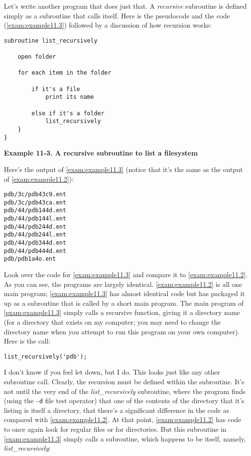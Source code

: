 Let's write another program that does just that. A \textit{recursive} subroutine is defined simply as a subroutine that calls itself. Here is the pseudocode and the code (\autoref{exam:example11.3}) followed by a discussion of how recursion works: 

\begin{lstlisting}
subroutine list_recursively

    open folder

    for each item in the folder

        if it's a file
            print its name

        else if it's a folder
            list_recursively
    }
}
\end{lstlisting}

\textbf{Example 11-3. A recursive subroutine to list a filesystem}


Here's the output of \autoref{exam:example11.3} (notice that it's the same as the output of \autoref{exam:example11.2}): 

\begin{lstlisting}
pdb/3c/pdb43c9.ent
pdb/3c/pdb43ca.ent
pdb/44/pdb144d.ent
pdb/44/pdb144l.ent
pdb/44/pdb244d.ent
pdb/44/pdb244l.ent
pdb/44/pdb344d.ent
pdb/44/pdb444d.ent
pdb/pdb1a4o.ent
\end{lstlisting}

Look over the code for \autoref{exam:example11.3} and compare it to \autoref{exam:example11.2}. As you can see, the programs are largely identical. \autoref{exam:example11.2} is all one main program; \autoref{exam:example11.3} has almost identical code but has packaged it up as a subroutine that is called by a short main program. The main program of \autoref{exam:example11.3} simply calls a recursive function, giving it a directory name (for a directory that exists on my computer; you may need to change the directory name when you attempt to run this program on your own computer). Here is the call:

\begin{lstlisting}
list_recursively('pdb');
\end{lstlisting}

I don't know if you feel let down, but I do. This looks just like any other subroutine call. Clearly, the recursion must be defined within the subroutine. It's not until the very end of the \textit{list\_recursively} subroutine, where the program finds (using the \verb|-d| file test operator) that one of the contents of the directory that it's listing is itself a directory, that there's a significant difference in the code as compared with \autoref{exam:example11.2}. At that point, \autoref{exam:example11.2} has code to once again look for regular files or for directories. But this subroutine in \autoref{exam:example11.3} simply calls a subroutine, which happens to be itself, namely, \textit{list\_recursively}: 

